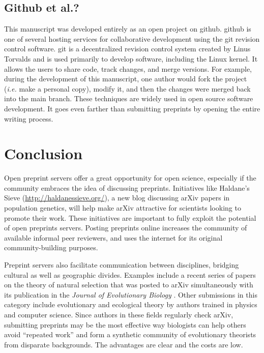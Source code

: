 \documentclass[letterpaper,twocolumn,superscriptaddress,showkeys]{revtex4-1}
\begin{document}
\subsection{Github et al.?}

This manuscript was developed entirely as an open project on github. github is
one of several hosting services for collaborative development using the git
revision control software.  git is a decentralized revision control system
created by Linus Torvalds and is used primarily to develop software, including
the Linux kernel. It allows the users to share code, track changes, and merge
versions. For example, during the development of this manuscript, one author
would fork the project (\emph{i.e.} make a personal copy), modify it, and then the
changes were merged back into the main branch. These techniques are widely used
in open source software development. It goes even farther than submitting
preprints by opening the entire writing process.

\section{Conclusion}

Open preprint servers offer a great opportunity for open science, especially if
the community embraces the idea of discussing preprints. Initiatives like
Haldane's Sieve (\href{http://haldanessieve.org/}{http://haldanessieve.org/}), a
new blog discussing arXiv papers in population genetics, will help make arXiv
attractive for scientists looking to promote their work. These initiatives are
important to fully exploit the potential of open preprints servers. Posting
preprints online increases the community of available informal peer reviewers,
and uses the internet for its original community-building purposes.

Preprint servers also facilitate communication between disciplines, bridging
cultural as well as geographic divides. Examples include a recent series of
papers on the theory of natural selection that was posted to arXiv
simultaneously with its publication in the \emph{Journal of Evolutionary
Biology} \cite{JEB:JEB2431,JEB:JEB2498,JEB:JEB2378,JEB:JEB2373}. Other
submissions in this category include evolutionary and ecological theory by
authors trained in physics and computer science.  Since authors in these fields
regularly check arXiv, submitting preprints may be the most effective way
biologists can help others avoid ``repeated work'' \cite{de2011contribution} and
form a synthetic community of evolutionary theorists from disparate backgrounds.
The advantages are clear and the costs are low.
\end{document}
